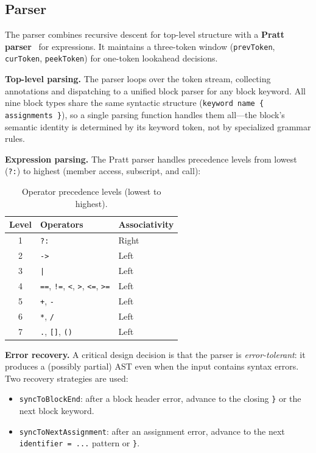 \documentclass[sigconf,nonacm]{acmart}
\begin{document}
\subsection{Parser}
\label{sec:compiler:parser}

The parser combines recursive descent for top-level structure with a
\textbf{Pratt parser}~\cite{pratt1973} for expressions. It maintains a
three-token window (\texttt{prevToken}, \texttt{curToken},
\texttt{peekToken}) for one-token lookahead decisions.

\noindent\textbf{Top-level parsing.} The parser loops over the token
stream, collecting annotations and dispatching to a unified block parser
for any block keyword. All nine block types share the same syntactic
structure (\texttt{keyword name \{ assignments \}}), so a single parsing
function handles them all---the block's semantic identity is determined
by its keyword token, not by specialized grammar rules.

\noindent\textbf{Expression parsing.} The Pratt parser handles
precedence levels from lowest (\texttt{?:}) to highest (member access,
subscript, and call):

\begin{table}[t]
\caption{Operator precedence levels (lowest to highest).}
\label{tab:precedence}
\centering
\small
\begin{tabular}{@{}cll@{}}
\toprule
\textbf{Level} & \textbf{Operators} & \textbf{Associativity} \\
\midrule
1 & \texttt{?:}             & Right \\
2 & \texttt{->}             & Left \\
3 & \texttt{|}              & Left \\
4 & \texttt{==}, \texttt{!=}, \texttt{<}, \texttt{>}, \texttt{<=}, \texttt{>=} & Left \\
5 & \texttt{+}, \texttt{-}  & Left \\
6 & \texttt{*}, \texttt{/}  & Left \\
7 & \texttt{.}, \texttt{[]}, \texttt{()} & Left \\
\bottomrule
\end{tabular}
\end{table}

\noindent\textbf{Error recovery.} A critical design decision is that the
parser is \emph{error-tolerant}: it produces a (possibly partial) AST even
when the input contains syntax errors. Two recovery strategies are used:

\begin{itemize}[leftmargin=*]
  \item \texttt{syncToBlockEnd}: after a block header error, advance to the
        closing \texttt{\}} or the next block keyword.
  \item \texttt{syncToNextAssignment}: after an assignment error, advance to
        the next \texttt{identifier = ...} pattern or \texttt{\}}.
\end{itemize}
\end{document}

